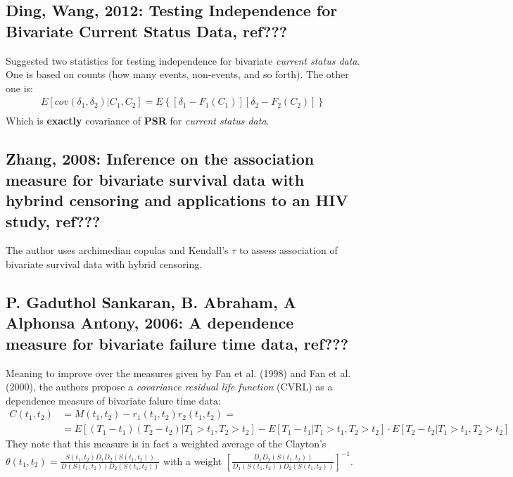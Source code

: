 \documentclass[]{article}
\begin{document}
\subsection{Ding, Wang, 2012: Testing Independence for Bivariate Current Status Data, ref???}
Suggested two statistics for testing independence for bivariate \emph{current status data}. One is based on counts (how many events, non-events, and so forth). The other one is:
	$$
	\begin{aligned}
		 E[cov(\delta_1, \delta_2)|C_1,C_2] = E\left\{ [\delta_1 - F_1(C_1)][\delta_2 - F_2(C_2)]  \right\}\\
	\end{aligned}
	$$
Which is \textbf{exactly} covariance of \textbf{PSR} for \emph{current status data}.

\subsection{Zhang, 2008: Inference on the association measure for bivariate survival data with hybrind censoring and applications to an HIV study, ref???}
The author uses archimedian copulas and Kendall's $\tau$ to assess association of bivariate survival data with hybrid censoring.

\subsection{P. Gaduthol Sankaran, B. Abraham, A Alphonsa Antony, 2006: A dependence measure for bivariate failure time data, ref???}
Meaning to improve over the measures given by Fan et al. (1998) and Fan et al. (2000), the authors propose a \emph{covariance residual life function} (CVRL) as a dependence measure of bivariate falure time data:
	$$
	\begin{aligned}
		 C(t_1, t_2) &= M(t_1, t_2) - r_1(t_1, t_2) r_2(t_1, t_2) =\\
		  &=E[(T_1-t_1)(T_2-t_2)|T_1>t_1,T_2>t_2] - E[T_1-t_1|T_1>t_1,T_2>t_2]\cdot E[T_2-t_2|T_1>t_1,T_2>t_2]
	\end{aligned}
	$$
They note that this measure is in fact a weighted average of the Clayton's $\theta(t_1,t_2) = \frac{S(t_1,t_2)D_1D_2(S(t_1,t_2))}{D(S(t_1,t_2))D_2(S(t_1,t_2))}$ with a weight $\left[ \frac{D_1D_2(S(t_1,t_2))}{D_1(S(t_1,t_2))D_2(S(t_1,t_2))} \right]^{-1}$.
\end{document}
